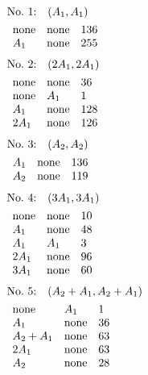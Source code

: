 \begin{align*}
&\hbox to 4cm {\textrm{No.~1:}\quad$(A_{1}, A_{1})$\hss}\\ 
&\begin{array}{lll}
\none & \none & 136\\
A_{1} & \none & 255\\
\end{array}
\end{align*}
%
%
\begin{align*}
&\hbox to 4cm {\textrm{No.~2:}\quad$(2A_{1}, 2A_{1})$\hss}\\ 
&\begin{array}{lll}
\none & \none & 36\\
\none & A_{1} & 1\\
A_{1} & \none & 128\\
2A_{1} & \none & 126\\
\end{array}
\end{align*}
%
%
\begin{align*}
&\hbox to 4cm {\textrm{No.~3:}\quad$(A_{2}, A_{2})$\hss}\\ 
&\begin{array}{lll}
A_{1} & \none & 136\\
A_{2} & \none & 119\\
\end{array}
\end{align*}
%
%
\begin{align*}
&\hbox to 4cm {\textrm{No.~4:}\quad$(3A_{1}, 3A_{1})$\hss}\\ 
&\begin{array}{lll}
\none & \none & 10\\
A_{1} & \none & 48\\
A_{1} & A_{1} & 3\\
2A_{1} & \none & 96\\
3A_{1} & \none & 60\\
\end{array}
\end{align*}
%
%
\begin{align*}
&\hbox to 4cm {\textrm{No.~5:}\quad$(A_{2}+A_{1}, A_{2}+A_{1})$\hss}\\ 
&\begin{array}{lll}
\none & A_{1} & 1\\
A_{1} & \none & 36\\
A_{2}+A_{1} & \none & 63\\
2A_{1} & \none & 63\\
A_{2} & \none & 28\\
\end{array}
\end{align*}
